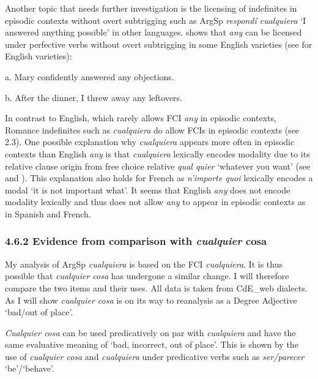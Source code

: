 \documentclass[output=paper]{langscibook}
\begin{document}
  Another topic that needs further investigation is the licensing of indefinites in episodic contexts without overt subtrigging such as ArgSp \textit{respondí cualquiera} ‘I answered anything possible’ in other languages. \citet{Dayal1998} shows that \textit{any} can be licensed under perfective verbs without overt subtrigging in some English varieties (see \citealt{Dayal1998} for English varieties):

    a. Mary confidently answered any objections.

b. After the dinner, I threw away any leftovers. 

    \citep[446]{Dayal1998}

In contrast to English, which rarely allows FCI \textit{any} in episodic contexts, Romance indefinites such as \textit{cualquiera} do allow FCIs in episodic contexts (see 2.3). One possible explanation why \textit{cualquiera} appears more often in episodic contexts than English \textit{any} is that \textit{cualquiera} lexically encodes modality due to its relative clause origin from free choice relative \textit{qual quier} ‘whatever you want’ (see \citealt{Rivero2011} and ). This explanation also holds for French as \textit{n’importe quoi} lexically encodes a modal ‘it is not important what’. It seems that English \textit{any} does not encode modality lexically and thus does not allow \textit{any} to appear in episodic contexts as in Spanish and French. 

\subsubsection{\textbf{4.6.2} \textbf{Evidence} \textbf{from} \textbf{comparison} \textbf{with} \textbf{\textit{cualquier} \textbf{cosa}}}

My analysis of ArgSp \textit{cualquiera} is based on the FCI \textit{cualquiera}. It is thus possible that \textit{cualquier cosa} has undergone a similar change. I will therefore compare the two items and their uses. All data is taken from CdE\_web dialects. As I will show \textit{cualquier cosa} is on its way to reanalysis as a Degree Adjective ‘bad/out of place’. 

 \textit{Cualquier cosa} can be used predicatively on par with \textit{cualquiera} and have the same evaluative meaning of ‘bad, incorrect, out of place’. This is shown by the use of \textit{cualquier cosa} and \textit{cualquiera} under predicative verbs such as \textit{ser/parecer} ‘be’/‘behave’.
\end{document}
